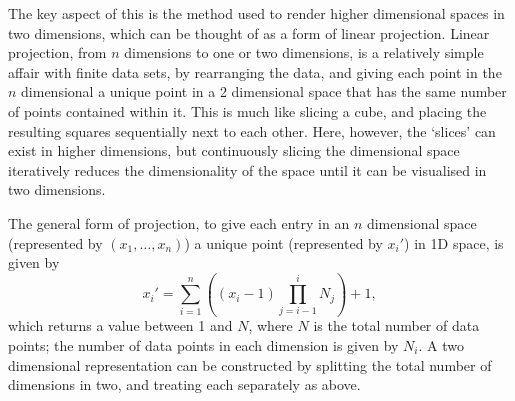 \documentclass[../thesis-main.tex]{subfiles}
\begin{document}
The key aspect of this is the method used to render higher dimensional spaces in two dimensions, which can be thought of as a form of linear projection. Linear projection, from $n$ dimensions to one or two dimensions, is a relatively simple affair with finite data sets, by rearranging the data, and giving each point in the $n$ dimensional a unique point in a 2 dimensional space that has the same number of points contained within it. This is much like slicing a cube, and placing the resulting squares sequentially next to each other. Here, however, the `slices' can exist in higher dimensions, but continuously slicing the dimensional space iteratively reduces the dimensionality of the space until it can be visualised in two dimensions.

The general form of projection, to give each entry in an $n$ dimensional space (represented by $(x_1,\ldots{},x_n)$) a unique point (represented by $x_i'$) in 1D space, is given by
\begin{equation}
 x_i' = \sum_{i=1}^n\left((x_i-1)\prod_{j=i-1}^i N_j\right) + 1,\label{eq:paramSpace-projection}
\end{equation}
which returns a value between 1 and $N$, where $N$ is the total number of data points; the number of data points in each dimension is given by $N_i$. A two dimensional representation can be constructed by splitting the total number of dimensions in two, and treating each separately as above.
\end{document}
